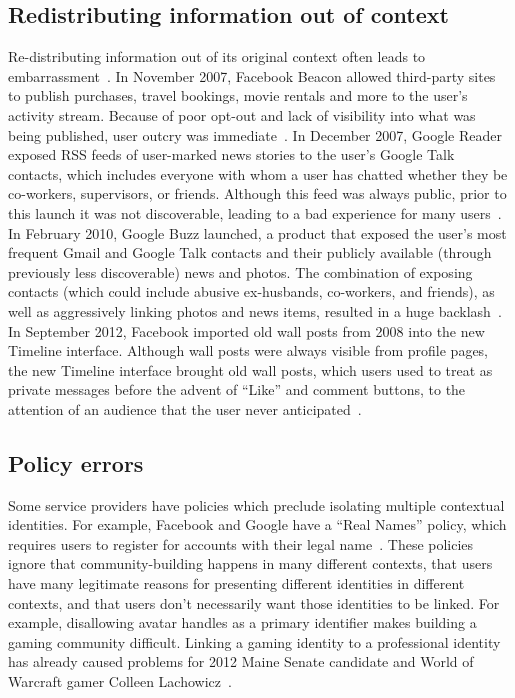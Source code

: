 \documentclass[10pt, conference, compsocconf]{IEEEtran}
\begin{document}
\subsection{Redistributing information out of context}
Re-distributing information out of its original context often leads to
embarrassment~\cite{nissenbaum}.  In November 2007, Facebook Beacon allowed
third-party sites to publish purchases, travel bookings, movie rentals and more
to the user's activity stream.  Because of poor opt-out and lack of visibility
into what was being published, user outcry was
immediate~\cite{mccarthy,nakashima}.  In December 2007, Google Reader exposed
RSS feeds of user-marked news stories to the user's Google Talk contacts, which
includes everyone with whom a user has chatted whether they be co-workers,
supervisors, or friends. Although this feed was always public, prior to this
launch it was not discoverable, leading to a bad experience for many
users~\cite{helft}. In February 2010, Google Buzz launched, a product that
exposed the user's most frequent Gmail and Google Talk contacts and their
publicly available (through previously less discoverable) news and photos.  The
combination of exposing contacts (which could include abusive ex-husbands,
co-workers, and friends), as well as aggressively linking photos and news
items, resulted in a huge backlash~\cite{fugitivus,buzz}. In September 2012,
Facebook imported old wall posts from 2008 into the new Timeline interface.
Although wall posts were always visible from profile pages, the new Timeline
interface brought old wall posts, which users used to treat as private messages
before the advent of ``Like'' and comment buttons, to the attention of an
audience that the user never anticipated~\cite{timeline}.

\subsection{Policy errors}
\label{sec:policies}
Some service providers have policies which preclude isolating multiple
contextual identities. For example, Facebook and Google have a ``Real Names''
policy, which requires users to register for accounts with their legal
name~\cite{fb_names,google_names}.  These policies ignore that
community-building happens in many different contexts, that users have many
legitimate reasons for presenting different identities in different contexts,
and that users don't necessarily want those identities to be linked. For
example, disallowing avatar handles as a primary identifier makes building a
gaming community difficult.  Linking a gaming identity to a professional
identity has already caused problems for 2012 Maine Senate candidate and World
of Warcraft gamer Colleen Lachowicz~\cite{maine}.
\end{document}
